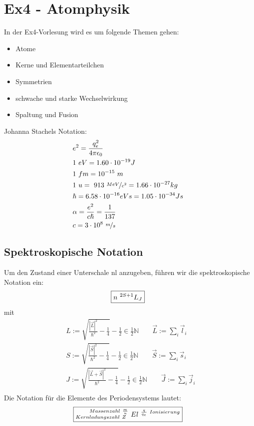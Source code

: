 \documentclass[Ex4_Zusammenfassung.tex]{subfiles}
\begin{document}
\chapter{ Ex4 - Atomphysik}

In der Ex4-Vorlesung wird es um folgende Themen gehen:

\begin{itemize}
\item Atome
\item Kerne und Elementarteilchen
\item Symmetrien
\item schwache und starke Wechselwirkung
\item Spaltung und Fusion 
\end{itemize}
Johanna Stachels Notation: 
\begin{align*}
& e^2 = \frac{q_e^2}{4\pi \epsilon_{0}}  \\
& 1 \ eV = 1.60 \cdot 10^{-19} J  \\
& 1 \ fm = 10^{-15}  \ m \\ 
& 1 \ u = \  913 \ \nicefrac{MeV}{c^2} = 1.66 \cdot 10^{-27} kg \\
& \hslash = 6.58 \cdot 10^{-16} eVs = 1.05 \cdot 10^{-34} Js \\
&\alpha = \frac {e^2}{c \hslash} = \frac{1}{137} \\
&c = 3 \cdot 10^8 \  \nicefrac{m}{s} \\
\end{align*} 

\section{Spektroskopische Notation}
Um den Zustand einer Unterschale nl anzugeben, führen wir die spektroskopische Notation ein: 
\begin{equation}
\centering \boxed{ n \ ^{2S+1}L_J }
\end{equation}
mit
\begin{align*}
&L := \sqrt{\frac{|\vec L|^2}{\hslash^2}- \frac{1}{4}} - \frac{1}{2} \in \frac{1}{2} \mathbb{N} \qquad \vec L:= \sum_{i} \vec l_i \\
&S :=  \sqrt{\frac{|\vec S|^2}{\hslash^2}- \frac{1}{4}} - \frac{1}{2} \in \frac{1}{2} \mathbb{N}  \qquad \vec S:= \sum_{i} \vec s_i \\
&J :=  \sqrt{\frac{|\vec L + \vec S |^2}{\hslash^2}- \frac{1}{4}} - \frac{1}{2} \in \frac{1}{2} \mathbb{N} \qquad \vec J:= \sum_{i} \vec j_i \\
\end{align*}
\newline
Die Notation für die Elemente des Periodensystems lautet: 
\begin{equation}
\centering \boxed{^{\qquad Massenzahl \  \frac{m}{u} } _{Kernladungszahl \  Z} \  El ^{\ \frac{q}{q_e} \  Ionisierung}} 
\end{equation}
\end{document}
